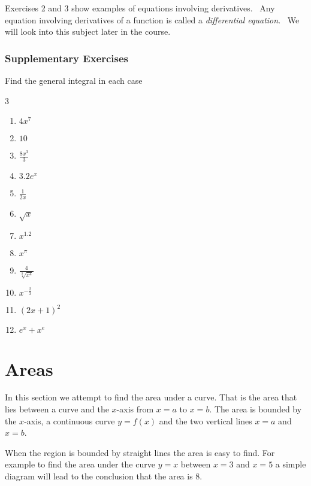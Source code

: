 Exercises 2 and 3 show examples of equations involving derivatives.
\ Any equation involving derivatives of a function is called a \emph{differential equation}.
\ We will look into this subject later in the course. 

\subsubsection{Supplementary Exercises}
Find the general integral in each case 


\columnsep =30pt
\begin {multicols}{3}
\begin{enumerate}
\item $4 x^{7}$ 

\item $10$ 

\item $\frac{8 x^{3}}{3}$ 

\item $3.2 e^{x}$ 

\item $\frac{1}{2 x}$ 

\item $\sqrt{x}$ 

\item $x^{1.2}$ 

\item $x^{\pi }$ 

\item $\frac{4}{\sqrt[{3}]{x^{4}}}$ 

\item $x^{ -\frac{2}{3}}$ 

\item $\left (2 x +1\right )^{2}$ 

\item $e^{x} +x^{e}$ 
\end{enumerate}
\end {multicols}
 

\section{Areas}
In this section we attempt to find the area under a curve. That is the area that lies between a curve
and the $x$-axis from $x =a$ to $x =b$. The area is bounded by the $x$-axis, a continuous curve $y =f (x)$ and the two vertical lines $x =a$ and $x =b$. 

When the region is bounded by straight lines the area is easy to find. For
example to find the area under the curve $y =x$ between $x =3$ and $x =5$ a simple diagram will lead to the conclusion that the area is $8$. 


